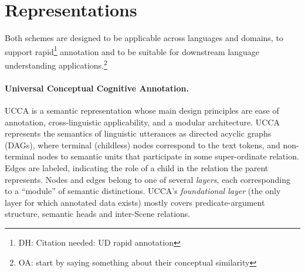 \documentclass[11pt,a4paper]{article}
\newcommand{\oa}[1]{\footnote{\color{red}OA: #1}}
\newcommand{\daniel}[1]{\footnote{\color{blue}DH: #1}}
\begin{document}

\section{Representations}\label{sec:representations}

  Both schemes are designed to be applicable across languages and domains, 
  to support rapid\daniel{Citation needed: UD rapid annotation}
  annotation and to be suitable for downstream language understanding
  applications.\oa{start by saying something about their conceptual similarity}



\paragraph{Universal Conceptual Cognitive Annotation.}\label{sec:ucca}
UCCA \cite{abend2013universal} is a semantic representation whose main design principles
are ease of annotation, cross-linguistic applicability, and a modular architecture.
UCCA represents the semantics of linguistic utterances
as directed acyclic graphs (DAGs), where terminal (childless) nodes
correspond to the text tokens, and non-terminal nodes to semantic units that participate
in some super-ordinate relation.
Edges are labeled, indicating the role of a child in the relation the parent represents.
Nodes and edges belong to one of several \textit{layers}, each corresponding
to a ``module'' of semantic distinctions.
UCCA's \textit{foundational layer} (the only layer for which annotated data exists)
mostly covers predicate-argument structure, semantic heads and inter-Scene relations.

\end{document}

